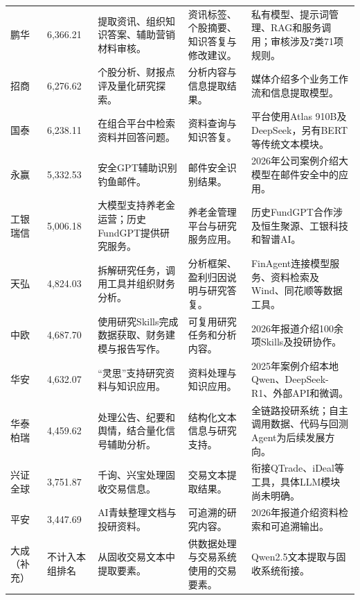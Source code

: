 {\begin{longtable}{@{}P{17mm}P{20mm}P{34mm}P{34mm}P{46mm}@{}}
鹏华 & 6,366.21 & 提取资讯、组织知识答案、辅助营销材料审核。 & 资讯标签、个股摘要、知识答复与修改建议。 & 私有模型、提示词管理、RAG和服务调用；审核涉及7类71项规则。\\
招商 & 6,276.62 & 个股分析、财报点评及量化研究探索。 & 分析内容与信息提取结果。 & 媒体介绍多个业务工作流和信息提取模型。\\
国泰 & 6,238.11 & 在组合平台中检索资料并回答问题。 & 资料查询与知识答复。 & 平台使用Atlas 910B及DeepSeek，另有BERT等传统文本模块。\\
永赢 & 5,332.53 & 安全GPT辅助识别钓鱼邮件。 & 邮件安全识别结果。 & 2026年公司案例介绍大模型在邮件安全中的应用。\\
工银瑞信 & 5,006.18 & 大模型支持养老金运营；历史FundGPT提供研究服务。 & 养老金管理平台与研究服务应用。 & 历史FundGPT合作涉及恒生聚源、工银科技和智谱AI。\\
天弘 & 4,824.03 & 拆解研究任务，调用工具并组织财务分析。 & 分析框架、盈利归因说明与研究答复。 & FinAgent连接模型服务、资料检索及Wind、同花顺等数据工具。\\
中欧 & 4,687.70 & 使用研究Skills完成数据获取、财务建模与报告写作。 & 可复用研究任务和分析内容。 & 2026年报道介绍100余项Skills及投研协作。\\
华安 & 4,632.07 & “灵思”支持研究资料与知识应用。 & 资料处理与知识应用。 & 2025年案例介绍本地Qwen、DeepSeek-R1、外部API和微调。\\
华泰柏瑞 & 4,459.62 & 处理公告、纪要和舆情，结合量化信号辅助分析。 & 结构化文本信息与研究支持。 & 全链路投研系统；自主调用数据、代码与回测Agent为后续发展方向。\\
兴证全球 & 3,751.87 & 千询、兴宝处理固收交易信息。 & 交易文本提取结果。 & 衔接QTrade、iDeal等工具，具体LLM模块尚未明确。\\
平安 & 3,447.69 & AI青蚨整理文档与投研资料。 & 可追溯的研究内容。 & 2026年报道介绍资料检索和可追溯输出。\\
大成\newline（补充） & 不计入本组排名 & 从固收交易文本中提取要素。 & 供数据处理与交易系统使用的交易要素。 & Qwen2.5文本提取与固收系统衔接。\\
\end{longtable}}
